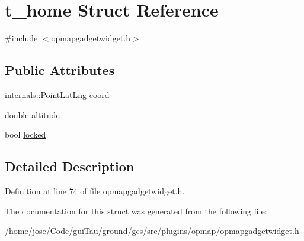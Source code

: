 \hypertarget{structt__home}{\section{t\-\_\-home Struct Reference}
\label{structt__home}
}


{\ttfamily \#include $<$opmapgadgetwidget.\-h$>$}

\subsection*{Public Attributes}
\begin{DoxyCompactItemize}
\item 
\hyperlink{structinternals_1_1_point_lat_lng}{internals\-::\-Point\-Lat\-Lng} \hyperlink{group___o_p_map_plugin_ga6324b0912396582281b54bc6d5a6f38a}{coord}
\item 
\hyperlink{_super_l_u_support_8h_a8956b2b9f49bf918deed98379d159ca7}{double} \hyperlink{group___o_p_map_plugin_ga14ce78cb516fe7a0e7f20e423e92d538}{altitude}
\item 
bool \hyperlink{group___o_p_map_plugin_ga4cc9a1ca8d219f1aa6d823fab6080f02}{locked}
\end{DoxyCompactItemize}


\subsection{Detailed Description}


Definition at line 74 of file opmapgadgetwidget.\-h.



The documentation for this struct was generated from the following file\-:\begin{DoxyCompactItemize}
\item 
/home/jose/\-Code/gui\-Tau/ground/gcs/src/plugins/opmap/\hyperlink{opmapgadgetwidget_8h}{opmapgadgetwidget.\-h}\end{DoxyCompactItemize}
